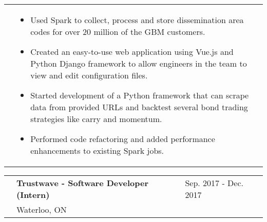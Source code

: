 \documentclass[letter, 10.5pt]{article}
\newcommand\workspacing{0.4cm}
\newcommand\bulletspacing{-0.15cm}
\newcommand\firstcolwidth{2.5cm}
\newcommand\listwidth{0.809\textwidth}
\begin{document}
    \begin{tabularx}{\textwidth}{@{}p{\firstcolwidth}X}
        & 
        \begin{minipage}[t]{\listwidth}
            \begin{itemize}
                \vspace{-0.3cm}
                \item Used Spark to collect, process and store dissemination area codes for over 20 million of the GBM customers.
                \vspace{\bulletspacing}
                \item Created an easy-to-use web application using Vue.js and Python Django framework to allow engineers in the team to view and edit configuration files.
                \vspace{\bulletspacing}
                \item Started development of a Python framework that can scrape data from provided URLs and backtest several bond trading strategies like carry and momentum.
                \vspace{\bulletspacing}
                \item Performed code refactoring and added performance enhancements to existing Spark jobs.
            \end{itemize}
        \end{minipage} \\
    \end{tabularx}
    \newline
    \vspace{\workspacing}
    \newline
    \begin{tabularx}{\textwidth}{@{}p{\firstcolwidth}Xl}
        & \textbf{Trustwave - Software Developer (Intern)} & Sep. 2017 - Dec. 2017 \\
        & Waterloo, ON & \\
    \end{tabularx}
    \newline
\end{document}
